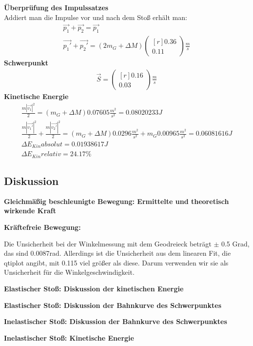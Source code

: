 \documentclass{article}
\begin{document}
\textbf{Überprüfung des Impulssatzes} \\
Addiert man die Impulse vor und nach dem Stoß erhält man:
\begin{gather*}
\vec{p_1}+\vec{p_2}=\vec{p_1} \\
\vec{p_1'}+\vec{p_2'}=(2m_G+\Delta M)
\begin{pmatrix*}[r]
0.36 \\ 0.11
\end{pmatrix*} \frac{m}{s}
\end{gather*}
\textbf{Schwerpunkt}
\begin{gather*}
\vec{S}=
\begin{pmatrix*}[r]
0.16 \\ 0.03
\end{pmatrix*} \frac{m}{s}
\end{gather*}
\textbf{Kinetische Energie}
\begin{gather*}
\frac{m|\vec{v_1}|^2}{2}=(m_G+\Delta M)0.07605\frac{m^2}{s^2}=0.08020233J \\
\frac{m|\vec{v_1'}|^2}{2}+\frac{m|\vec{v_2'}|^2}{2}=(m_G+\Delta M)0.0296\frac{m^2}{s^2} + m_G0.00965\frac{m^2}{s^2}=0.06081616J \\
\Delta E_{Kin} absolut=0.01938617J \\
\Delta E_{Kin}relativ=24.17\%
\end{gather*}




\subsection{Diskussion}
\textbf{Gleichmäßig beschleunigte Bewegung: Ermittelte und theoretisch wirkende Kraft}


\textbf{Kräftefreie Bewegung: }

Die Unsicherheit bei der Winkelmessung mit dem Geodreieck beträgt $\pm$ 0.5 Grad, das sind 0.0087rad. Allerdings ist die Unsicherheit aus dem linearen Fit, die qtiplot angibt, mit 0.115 viel größer als diese. Darum verwenden wir sie als Unsicherheit für die Winkelgeschwindigkeit.


\textbf{Elastischer Stoß: Diskussion der kinetischen Energie}

\textbf{Elastischer Stoß: Diskussion der Bahnkurve des Schwerpunktes}


\textbf{Inelastischer Stoß: Diskussion der Bahnkurve des Schwerpunktes}

\textbf{Inelastischer Stoß: Kinetische Energie}
\end{document}
